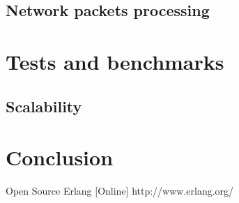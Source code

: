\documentclass[10pt, conference, compsocconf]{IEEEtran}
\begin{document}
\subsection{Network packets processing}

\section{Tests and benchmarks}

\subsection{Scalability}

\section{Conclusion}


\begin{thebibliography}{99}
Open Source Erlang [Online] http://www.erlang.org/

\end{thebibliography}
\end{document}
